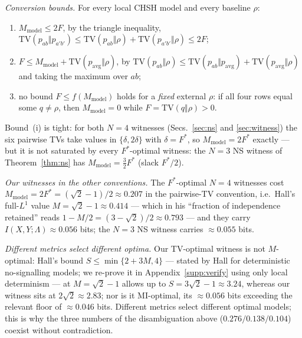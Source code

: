 \documentclass[aps,pra,reprint,superscriptaddress,floatfix]{revtex4-2}
\newcommand{\TV}{\mathrm{TV}}
\begin{document}
\emph{Conversion bounds.} For every local CHSH model and every baseline
$\rho$:
\begin{enumerate}
\item $M_{\mathrm{model}}\le 2F$, by the triangle inequality,
$\TV(p_{ab}\Vert p_{a'b'})\le\TV(p_{ab}\Vert\rho)
+\TV(p_{a'b'}\Vert\rho)\le 2F$;
\item $F\le M_{\mathrm{model}}+\TV(p_{\mathrm{avg}}\Vert\rho)$, by
$\TV(p_{ab}\Vert\rho)\le\TV(p_{ab}\Vert p_{\mathrm{avg}})
+\TV(p_{\mathrm{avg}}\Vert\rho)$ and taking the maximum over $ab$;
\item no bound $F\le f(M_{\mathrm{model}})$ holds for a \emph{fixed}
external $\rho$: if all four rows equal some $q\ne\rho$, then
$M_{\mathrm{model}}=0$ while $F=\TV(q\Vert\rho)>0$.
\end{enumerate}
Bound~(i) is tight: for both $N=4$ witnesses
(Secs.~\ref{sec:ns} and \ref{sec:witness}) the six pairwise TVs take
values in $\{\delta,2\delta\}$ with $\delta=F^*$, so
$M_{\mathrm{model}}=2F^*$ exactly --- but it is not saturated by every
$F^*$-optimal witness: the $N=3$ NS witness of
Theorem~\ref{thm:ns} has $M_{\mathrm{model}}=\tfrac32F^*$ (slack
$F^*/2$).

\emph{Our witnesses in the other conventions.} The $F^*$-optimal $N=4$
witnesses cost $M_{\mathrm{model}}=2F^*=(\sqrt2-1)/2\approx0.207$ in the
pairwise-TV convention, i.e.\ Hall's full-$L^1$ value
$M=\sqrt2-1\approx0.414$ --- which in his ``fraction of independence
retained'' reads $1-M/2=(3-\sqrt2)/2\approx0.793$ --- and they carry
$I(X,Y;\Lambda)\approx0.056$ bits; the $N=3$ NS witness carries
$\approx0.055$ bits.

\emph{Different metrics select different optima.} Our TV-optimal witness is
not $M$-optimal: Hall's bound $S\le\min\{2+3M,4\}$ --- stated by Hall for deterministic
no-signalling models; we re-prove it in Appendix~\ref{supp:verify} using only
local determinism --- at $M=\sqrt2-1$ allows up to
$S=3\sqrt2-1\approx3.24$, whereas our witness sits at
$2\sqrt2\approx2.83$; nor is it MI-optimal, its $\approx0.056$ bits
exceeding the relevant floor of $\approx0.046$ bits. Different metrics
select different optimal models; this is why the three numbers of the
disambiguation above ($0.276/0.138/0.104$) coexist without
contradiction.
\end{document}
